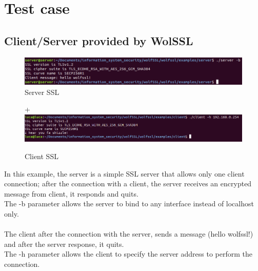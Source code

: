 \documentclass[a4paper,12pt]{report}
\begin{document}
\chapter{Test case}
\section{Client/Server provided by WolSSL}

\begin{figure}[H]
    \centering
    \includegraphics[scale=0.5]{test/examples/client-server/server.png}
    \caption{Server SSL}
    \label{fig:galaxy}
\end{figure}

\begin{figure}[H]+
    \centering
    \includegraphics[scale=0.45]{test/examples/client-server/client.png}
    \caption{Client SSL}
    \label{fig:galaxy}
\end{figure}

In this example, the server is a simple SSL server that allows only one client connection; after the connection with a client, the server receives an encrypted message from client, it responds and quits.
\\The -b parameter allows the server to bind to any interface instead of localhost only.
\\
\\The client after the connection with the server, sends a message (hello wolfssl!) and after the server response, it quits.
\\The -h parameter allows the client to specify the server address to perform the connection.
\end{document}
